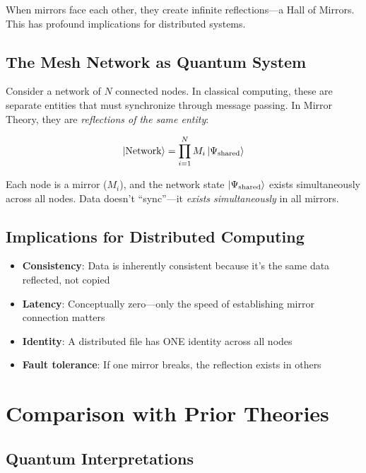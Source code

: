 \documentclass[12pt,a4paper]{article}
\begin{document}
When mirrors face each other, they create infinite reflections---a Hall of Mirrors. This has profound implications for distributed systems.

\subsection{The Mesh Network as Quantum System}

Consider a network of $N$ connected nodes. In classical computing, these are separate entities that must synchronize through message passing. In Mirror Theory, they are \textit{reflections of the same entity}:

\begin{equation}
\ket{\text{Network}} = \prod_{i=1}^{N} M_i \ket{\Psi_{\text{shared}}}
\end{equation}

Each node is a mirror ($M_i$), and the network state $\ket{\Psi_{\text{shared}}}$ exists simultaneously across all nodes. Data doesn't ``sync''---it \textit{exists simultaneously} in all mirrors.

\subsection{Implications for Distributed Computing}

\begin{itemize}
    \item \textbf{Consistency}: Data is inherently consistent because it's the same data reflected, not copied
    \item \textbf{Latency}: Conceptually zero---only the speed of establishing mirror connection matters
    \item \textbf{Identity}: A distributed file has ONE identity across all nodes
    \item \textbf{Fault tolerance}: If one mirror breaks, the reflection exists in others
\end{itemize}

\section{Comparison with Prior Theories}

\subsection{Quantum Interpretations}
\end{document}
